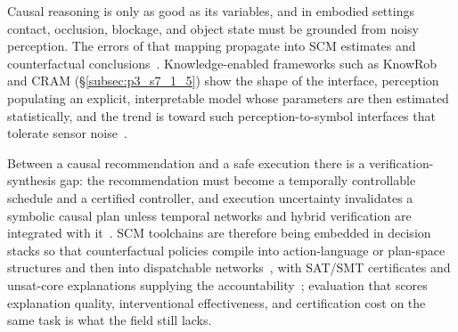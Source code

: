 Causal reasoning is only as good as its variables, and in embodied settings contact, occlusion, blockage, and object state must be grounded from noisy perception. The errors of that mapping propagate into SCM estimates and counterfactual conclusions~\cite{Peters2017Elements,DoWhy2020}. Knowledge-enabled frameworks such as KnowRob and CRAM (§\ref{subsec:p3_s7_1_5}) show the shape of the interface, perception populating an explicit, interpretable model whose parameters are then estimated statistically, and the trend is toward such perception-to-symbol interfaces that tolerate sensor noise~\cite{tenorth2013knowrob,beetz2010cram,beetz2023cram}.

Between a causal recommendation and a safe execution there is a verification-synthesis gap: the recommendation must become a temporally controllable schedule and a certified controller, and execution uncertainty invalidates a symbolic causal plan unless temporal networks and hybrid verification are integrated with it~\cite{Dechter1991STN,Morris2001STNU}. SCM toolchains are therefore being embedded in decision stacks so that counterfactual policies compile into action-language or plan-space structures and then into dispatchable networks~\cite{Bloebaum2024DoWhyGCM,Giunchiglia2004CPlus,Morris2001STNU}, with SAT/SMT certificates and unsat-core explanations supplying the accountability~\cite{Surynek2016SATMAPF,Gao2013dReal,Kong2015dReach}; evaluation that scores explanation quality, interventional effectiveness, and certification cost on the same task is what the field still lacks.
